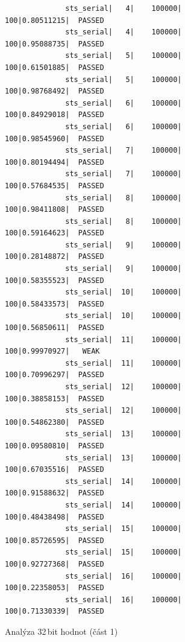 \documentclass[11pt, a4paper, titlepage]{article}
\begin{document}
\begin{figure}[H]
\begin{verbatim}
              sts_serial|   4|    100000|     100|0.80511215|  PASSED
              sts_serial|   4|    100000|     100|0.95088735|  PASSED
              sts_serial|   5|    100000|     100|0.61501885|  PASSED
              sts_serial|   5|    100000|     100|0.98768492|  PASSED
              sts_serial|   6|    100000|     100|0.84929018|  PASSED
              sts_serial|   6|    100000|     100|0.98545960|  PASSED
              sts_serial|   7|    100000|     100|0.80194494|  PASSED
              sts_serial|   7|    100000|     100|0.57684535|  PASSED
              sts_serial|   8|    100000|     100|0.98411808|  PASSED
              sts_serial|   8|    100000|     100|0.59164623|  PASSED
              sts_serial|   9|    100000|     100|0.28148872|  PASSED
              sts_serial|   9|    100000|     100|0.58355523|  PASSED
              sts_serial|  10|    100000|     100|0.58433573|  PASSED
              sts_serial|  10|    100000|     100|0.56850611|  PASSED
              sts_serial|  11|    100000|     100|0.99970927|   WEAK
              sts_serial|  11|    100000|     100|0.70996297|  PASSED
              sts_serial|  12|    100000|     100|0.38858153|  PASSED
              sts_serial|  12|    100000|     100|0.54862380|  PASSED
              sts_serial|  13|    100000|     100|0.09580810|  PASSED
              sts_serial|  13|    100000|     100|0.67035516|  PASSED
              sts_serial|  14|    100000|     100|0.91588632|  PASSED
              sts_serial|  14|    100000|     100|0.48438498|  PASSED
              sts_serial|  15|    100000|     100|0.85726595|  PASSED
              sts_serial|  15|    100000|     100|0.92727368|  PASSED
              sts_serial|  16|    100000|     100|0.22358053|  PASSED
              sts_serial|  16|    100000|     100|0.71330339|  PASSED
    \end{verbatim}
    \caption{Analýza 32\,bit hodnot (část 1)}
    \label{tab:analysis_32b_1}
\end{figure}


\newpage
\end{document}
